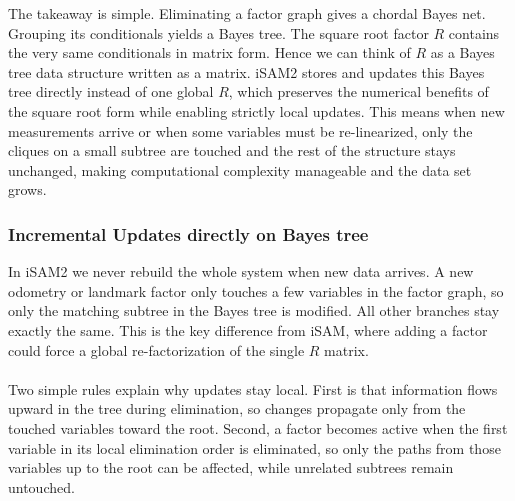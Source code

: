 \noindent
The takeaway is simple. Eliminating a factor graph gives a chordal Bayes net. Grouping its conditionals yields a Bayes tree. The square root factor $R$ contains the very same conditionals in matrix form. Hence we can think of $R$ as a Bayes tree data structure written as a matrix. \gls{iSAM}2 stores and updates this Bayes tree directly instead of one global $R$, which preserves the numerical benefits of the square root form while enabling strictly local updates. This means when new measurements arrive or when some variables must be re-linearized, only the cliques on a small subtree are touched and the rest of the structure stays unchanged, making computational complexity manageable and the data set grows.



\subsubsection{Incremental Updates directly on Bayes tree}
In \gls{iSAM}2 we never rebuild the whole system when new data arrives. A new odometry or landmark factor only touches a few variables in the factor graph, so only the matching subtree in the Bayes tree is modified. All other branches stay exactly the same. This is the key difference from \gls{iSAM}, where adding a factor could force a global re-factorization of the single $R$ matrix.
\\ \\
Two simple rules explain why updates stay local. First is that information flows upward in the tree during elimination, so changes propagate only from the touched variables toward the root. Second, a factor becomes active when the first variable in its local elimination order is eliminated, so only the paths from those variables up to the root can be affected, while unrelated subtrees remain untouched.
\\ \\
